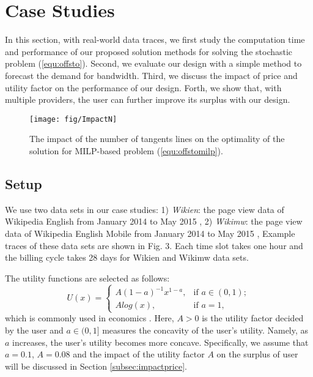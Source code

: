 \documentclass[10pt,journal,compsoc]{IEEEtran}
\begin{document}
\section{Case Studies}
In this section, with real-world data traces, we first study the computation time and performance of our proposed solution methods for solving the stochastic problem (\ref{equ:offsto}). Second, we evaluate our design with a simple method to forecast the demand for bandwidth. Third, we discuss the impact of price and utility factor on the performance of our design. Forth, we show that, with multiple providers, the user can further improve its surplus with our design.






















\begin{figure}[!t]
	\centering
	\texttt{[image: fig/ImpactN]}
	\caption{The impact of the number of tangents lines on the optimality of the solution for MILP-based  problem (\ref{equ:offstomilp}).}\label{fig:impactN}
\end{figure}




\subsection{Setup}\label{subsec:evaluationsetup}






We use two data sets in our case studies: 1) \emph{Wikien}: the page view data of Wikipedia English from January 2014 to May 2015 \cite{Wikipageview}, 2) \emph{Wikimw}: the page view data of Wikipedia English Mobile from January 2014 to May 2015 \cite{Wikipageview},  Example traces of these data sets are shown in Fig. 3. Each time slot takes one hour and the billing cycle takes 28 days for Wikien and Wikimw data sets.



The utility functions are selected as follows:
\begin{equation}\label{equ:utilityfunction}
U(x)=
\begin{cases}
A(1-a)^{-1}x^{1-a}, &\mbox{if $a \in(0,1)$};\\
Alog(x), &\mbox{if $a=1$},
\end{cases}
\end{equation}
which is commonly used in economics \cite{Joe-Wong2012, Nicholson2011}. Here, $A>0$ is the utility factor decided by the user and $a\in(0,1]$ measures the concavity of the user's utility. Namely, as $a$ increases, the user's utility becomes more concave. Specifically, we assume that $a=0.1$, $A=0.08$ and the impact of the utility factor $A$ on the surplus of user will be discussed in Section \ref{subsec:impactprice}.
\end{document}
